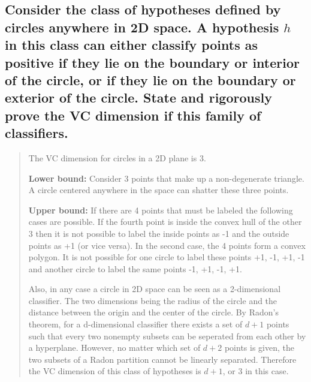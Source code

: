 \documentclass[11pt]{article}
\begin{document}
\subsection{Consider the class of hypotheses defined by circles anywhere in 2D space. A hypothesis $h$ in this class can either classify points as positive if they lie on the boundary or interior of the circle, or if they lie on the boundary or exterior of the circle. State and rigorously prove the VC dimension if this family of classifiers.}
\begin{quote}
	
	\vspace{3 mm}

	The VC dimension for circles in a 2D plane is 3.

	\vspace{1 mm}
	
	\textbf{Lower bound:} Consider 3 points that make up a non-degenerate triangle. A circle centered anywhere in the space can shatter these three points.

	\vspace{1 mm}

	\textbf{Upper bound:} If there are 4 points that must be labeled the following cases are possible. If the fourth point is inside the convex hull of the other 3 then it is not possible to label the inside points as -1 and the outside points as +1 (or vice versa). In the second case, the 4 points form a convex polygon. It is not possible for one circle to label these points +1, -1, +1, -1 and another circle to label the same points -1, +1, -1, +1. 
	
	\vspace{1 mm}
	
	Also, in any case a circle in 2D space can be seen as a 2-dimensional classifier. The two dimensions being the radius of the circle and the distance between the origin and the center of the circle. By Radon's theorem, for a d-dimensional classifier there exists a set of $d+1$ points such that every two nonempty subsets can be seperated from each other by a hyperplane. However, no matter which set of $d+2$ points is given, the two subsets of a Radon partition cannot be linearly separated. Therefore the VC dimension of this class of hypotheses is $d+1$, or 3 in this case.
\end{quote}
\end{document}
